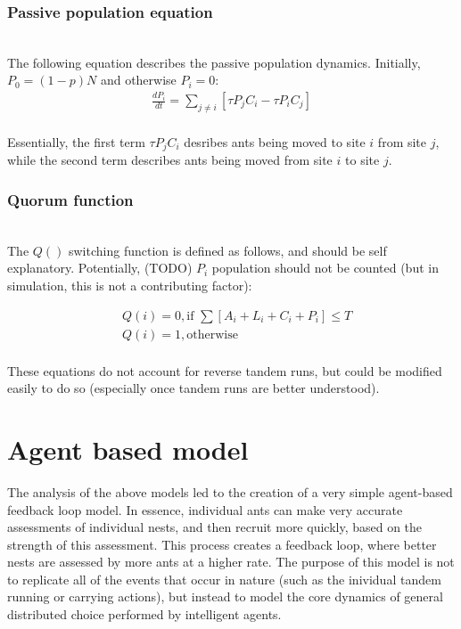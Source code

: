 \documentclass{article}
\begin{document}
\subsubsection{Passive population equation}
\hfill\\

The following equation describes the passive population dynamics. Initially, $P_0 = (1-p)N$ and otherwise $P_i = 0$:
\begin{equation}
\begin{aligned}
        \frac{dP_i}{dt} = \sum_{j \neq i} [\tau P_j C_i - \tau P_i C_j] \\
\end{aligned}
\end{equation}

Essentially, the first term $\tau P_jC_i$ desribes ants being moved to site $i$ from site $j$, while the second term describes ants being moved from site $i$ to site $j$.

\subsubsection{Quorum function}
\hfill\\

The $Q()$ switching function is defined as follows, and should be self explanatory. Potentially, (TODO) $P_i$ population should not be counted (but in simulation, this is not a contributing factor):

\begin{equation}
\begin{aligned}
  & Q(i) = 0, \text{if    } \sum [A_i + L_i + C_i + P_i] \leq T \\
  & Q(i) = 1, \text{otherwise} \\
\end{aligned}
\end{equation}

These equations do not account for reverse tandem runs, but could be modified easily to do so (especially once tandem runs are better understood).



\section{Agent based model}

The analysis of the above models led to the creation of a very simple agent-based feedback loop model.
In essence, individual ants can make very accurate assessments of individual nests, and then recruit more quickly, based on the strength of this assessment.
This process creates a feedback loop, where better nests are assessed by more ants at a higher rate.
The purpose of this model is not to replicate all of the events that occur in nature (such as the inividual tandem running or carrying actions), but instead to model the core dynamics of general distributed choice performed by intelligent agents.
\end{document}
